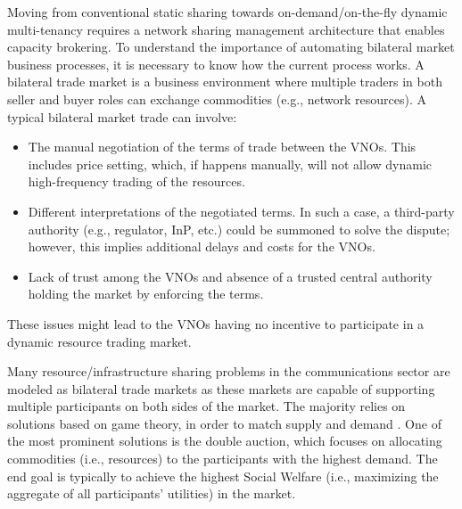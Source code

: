 Moving from conventional static sharing towards on-demand/on-the-fly dynamic multi-tenancy \cite{7514161} requires a network sharing management architecture that enables capacity brokering. To understand the importance of automating bilateral market business processes, it is necessary to know how the current process works. 
A bilateral trade market is a business environment where multiple traders in both seller and buyer roles can exchange commodities (e.g., network resources). %
A typical bilateral market trade can involve: 
\begin{itemize}
    \item The manual negotiation of the terms of trade between the \acp{VNO}. This includes price setting, which, if happens manually, will not allow dynamic high-frequency trading of the resources.
    \item Different interpretations of the negotiated terms. In such a case, a third-party authority (e.g., regulator, \ac{InP}, etc.) could be summoned to solve the dispute; however, this implies additional delays and costs for the \acp{VNO}.
    \item Lack of trust among the \acp{VNO} and absence of a trusted central authority holding the market by enforcing the terms. 
\end{itemize}

These issues might lead to the \acp{VNO} having no incentive to participate in a dynamic resource trading market.


Many resource/infrastructure sharing problems in the communications sector are modeled as bilateral trade markets as these markets are capable of supporting multiple participants on both sides of the market. The majority relies on solutions based on game theory, in order to match supply and demand \cite{8542782,8665886,8664672,8395445,8488596}. One of the most prominent solutions is the double auction, which focuses on allocating commodities (i.e., resources) to the participants with the highest demand. The end goal is typically to achieve the highest Social Welfare (i.e., maximizing the aggregate of all participants' utilities) in the market. 

